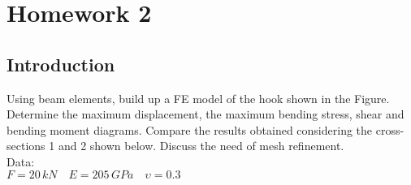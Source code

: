 \chapter{Homework 2}
\section{Introduction}
Using beam elements, build up a FE model of the hook shown in the Figure. Determine the
maximum displacement, the maximum bending stress, shear and bending moment diagrams. Compare the results obtained considering the cross-sections 1 and 2 shown
below. Discuss the need of mesh refinement.\\
\noindent Data:\\
$F = 20 \, kN \quad E = 205 \, GPa \quad \upsilon=0.3$\\
\begin{figure}[!h]
\centering
{} \quad
{} 
\end{figure}
